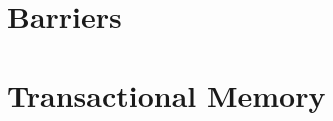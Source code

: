 \documentclass[letter,12pt]{report}
\begin{document}
\chapter{Barriers}

%

%


\chapter{Transactional Memory}
%

%
\end{document}
